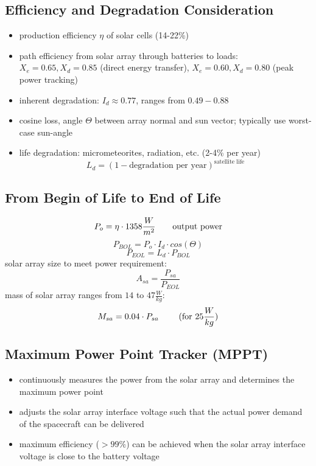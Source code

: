 \subsection{Efficiency and Degradation Consideration}
\begin{itemize}
 \item production efficiency $\eta$ of solar cells (14-22\%)
 \item path efficiency from solar array through batteries to loads: $X_e=0.65, X_d=0.85$ (direct energy transfer), $X_e=0.60, X_d=0.80$ (peak power tracking)
 \item inherent degradation: $I_d \approx 0.77$, ranges from $0.49-0.88$
 \item cosine loss, angle $\Theta$ between array normal and sun vector; typically use worst-case sun-angle
 \item life degradation: micrometeorites, radiation, etc. (2-4\% per year)\[L_d = (1-\text{degradation per year})^{\text{satellite life}}\]
\end{itemize}
\subsection{From Begin of Life to End of Life}
\[P_{o} = \eta\cdot 1358\frac{W}{m^2} \text{\qquad output power}\]
\[P_{BOL} = P_o\cdot I_d\cdot cos(\Theta)\]
\[P_{EOL} = L_d\cdot P_{BOL}\]
solar array size to meet power requirement:
\[A_{sa} = \frac{P_{sa}}{P_{EOL}}\]
mass of solar array ranges from $14$ to $47 \frac{W}{kg}$:
\[M_{sa} = 0.04\cdot P_{sa} \text{ \qquad (for } 25 \frac{W}{kg})\]
\subsection{Maximum Power Point Tracker (MPPT)}
\begin{itemize}
 \item continuously measures the power from the solar array and determines the maximum power point 
 \item adjusts the solar array interface voltage such that the actual power demand of the spacecraft can be delivered
 \item maximum efficiency ($>99\%$) can be achieved when the solar array interface voltage is close to the battery voltage
\end{itemize}
